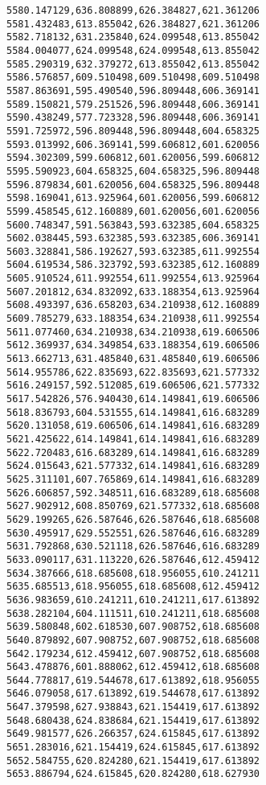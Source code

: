 \documentclass[11pt]{article}
\begin{document}
\begin{Verbatim}[commandchars=\\\{\}]
5580.147129,636.808899,626.384827,621.361206
5581.432483,613.855042,626.384827,621.361206
5582.718132,631.235840,624.099548,613.855042
5584.004077,624.099548,624.099548,613.855042
5585.290319,632.379272,613.855042,613.855042
5586.576857,609.510498,609.510498,609.510498
5587.863691,595.490540,596.809448,606.369141
5589.150821,579.251526,596.809448,606.369141
5590.438249,577.723328,596.809448,606.369141
5591.725972,596.809448,596.809448,604.658325
5593.013992,606.369141,599.606812,601.620056
5594.302309,599.606812,601.620056,599.606812
5595.590923,604.658325,604.658325,596.809448
5596.879834,601.620056,604.658325,596.809448
5598.169041,613.925964,601.620056,599.606812
5599.458545,612.160889,601.620056,601.620056
5600.748347,591.563843,593.632385,604.658325
5602.038445,593.632385,593.632385,606.369141
5603.328841,586.192627,593.632385,611.992554
5604.619534,586.323792,593.632385,612.160889
5605.910524,611.992554,611.992554,613.925964
5607.201812,634.832092,633.188354,613.925964
5608.493397,636.658203,634.210938,612.160889
5609.785279,633.188354,634.210938,611.992554
5611.077460,634.210938,634.210938,619.606506
5612.369937,634.349854,633.188354,619.606506
5613.662713,631.485840,631.485840,619.606506
5614.955786,622.835693,622.835693,621.577332
5616.249157,592.512085,619.606506,621.577332
5617.542826,576.940430,614.149841,619.606506
5618.836793,604.531555,614.149841,616.683289
5620.131058,619.606506,614.149841,616.683289
5621.425622,614.149841,614.149841,616.683289
5622.720483,616.683289,614.149841,616.683289
5624.015643,621.577332,614.149841,616.683289
5625.311101,607.765869,614.149841,616.683289
5626.606857,592.348511,616.683289,618.685608
5627.902912,608.850769,621.577332,618.685608
5629.199265,626.587646,626.587646,618.685608
5630.495917,629.552551,626.587646,616.683289
5631.792868,630.521118,626.587646,616.683289
5633.090117,631.113220,626.587646,612.459412
5634.387666,618.685608,618.956055,610.241211
5635.685513,618.956055,618.685608,612.459412
5636.983659,610.241211,610.241211,617.613892
5638.282104,604.111511,610.241211,618.685608
5639.580848,602.618530,607.908752,618.685608
5640.879892,607.908752,607.908752,618.685608
5642.179234,612.459412,607.908752,618.685608
5643.478876,601.888062,612.459412,618.685608
5644.778817,619.544678,617.613892,618.956055
5646.079058,617.613892,619.544678,617.613892
5647.379598,627.938843,621.154419,617.613892
5648.680438,624.838684,621.154419,617.613892
5649.981577,626.266357,624.615845,617.613892
5651.283016,621.154419,624.615845,617.613892
5652.584755,620.824280,621.154419,617.613892
5653.886794,624.615845,620.824280,618.627930

\end{Verbatim}
\end{document}

